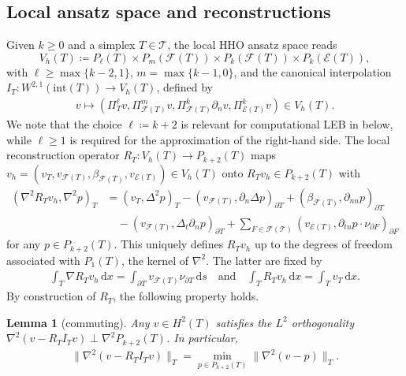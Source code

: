 \documentclass[a4paper]{amsart}
\numberwithin{equation}{section}
\newtheorem{lemma}[theorem]{Lemma}
\theoremstyle{definition}
\theoremstyle{remark}
\numberwithin{theorem}{section}
\numberwithin{equation}{section}
\numberwithin{table}{section}
\numberwithin{figure}{section}
\begin{document}
\subsection{Local ansatz space and reconstructions}
Given $k \geq 0$ and a simplex $T\in \mathcal{T}$, the local HHO ansatz space reads
\begin{equation*}
	V_h(T) \coloneqq P_{\ell}(T) \times P_{m}(\mathcal{F}(T))\times P_k(\mathcal{F}(T))\times P_k(\mathcal{E}(T)),
\end{equation*}
with $\ell \geq \max\{k-2,1\}$, $m=\max\{k-1,0\}$, and the canonical interpolation $I_T : W^{2,1}(\mathrm{int}(T)) \to V_h(T)$, defined by
\begin{align*}
    v \mapsto (\Pi_T^\ell v, \Pi_{\mathcal{F}(T)}^m v, \Pi_{\mathcal{F}(T)}^k \partial_n v, \Pi_{\mathcal{E}(T)}^k v) \in V_h(T).
\end{align*}
We note that the choice $\ell \coloneqq k+2$ is relevant for computational LEB in  below, while $\ell \geq 1$ is required for the approximation of the right-hand side.
The local reconstruction operator $R_T : V_h(T) \to P_{k+2}(T)$ maps $v_h = (v_T, v_{\mathcal{F}(T)}, \beta_{\mathcal{F}(T)}, v_{\mathcal{E}(T)}) \in V_h(T)$ onto $R_T v_h \in P_{k+2}(T)$ with
\begin{equation}\label{eq:local_restruct}
	\begin{aligned}
		(\nabla^2 R_T v_h, \nabla^2 p)_T & = (v_T,\Delta^2 p)_T - (v_{\mathcal{F}(T)}, \partial_n\Delta p)_{\partial T} + (\beta_{\mathcal{F}(T)}, \partial_{nn}p)_{\partial T} \\ &\quad - (v_{\mathcal{F}(T)},\Delta_t \partial_n p)_{\partial T} + \sum_{F \in \mathcal{F(T)}} (v_{\mathcal{E}(T)}, \partial_{tn} p\cdot \nu_{\partial F})_{\partial F}
	\end{aligned}
\end{equation}
for any $p \in P_{k+2}(T)$. This uniquely defines $R_T v_h$ up to the degrees of freedom associated with $P_1(T)$, the kernel of $\nabla^2$. The latter are fixed by
\begin{align}\label{def:rec_constr}
    \int_T \nabla R_T v_h \,\mathrm{d}x = \int_{\partial T} v_{\mathcal{F}(T)} \nu_{\partial T} \,\mathrm{d}s \quad\text{and}\quad
	\int_T R_T v_h \,\mathrm{d}x =	\int_T v_T \,\mathrm{d}x.
\end{align}
By construction of $R_T$, the following property holds.
\begin{lemma}[commuting]\label{lem:commuting}
    Any $v \in H^2(T)$ satisfies the $L^2$ orthogonality $\nabla^2 (v - R_T I_T v) \perp \nabla^2 P_{k+2}(T)$. In particular,
    \begin{align}\label{ineq:RI-best-appr}
        \|\nabla^2 (v - R_T I_T v)\|_T = \min_{p \in P_{k+2}(T)} \|\nabla^2 (v - p)\|_T.
    \end{align}
\end{lemma}
\end{document}
